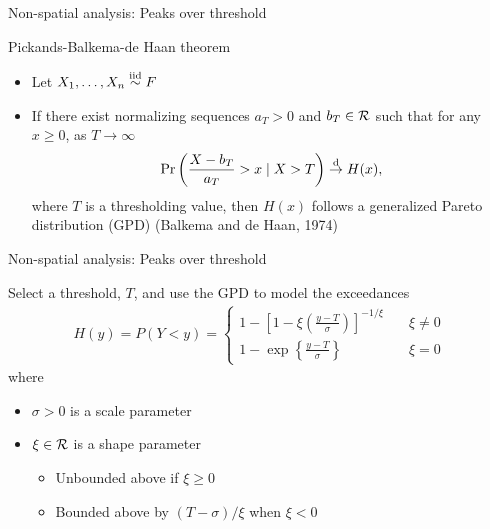 \documentclass{beamer}
\begin{document}
 \begin{frame}{Non-spatial analysis: Peaks over threshold}
 \begin{adjustwidth}{1em}{0em}
   Pickands-Balkema-de Haan theorem \vspace{1em}
   \begin{itemize} \setlength{\itemsep}{1em}
     \item Let $X_1, \ldots, X_n \stackrel{\mathrm{iid}}{\sim} F$
     \item If there exist normalizing sequences $a_T > 0$ and $b_T \in {\cal R}$ such that for any $x \ge 0$, as $T \rightarrow \infty$
     \begin{align*}
       \Pr\left(\frac{X - b_T}{a_T} > x \mid X > T\right) \stackrel{\mathrm{d}}{\rightarrow} H(x),
     \end{align*}
     where $T$ is a thresholding value, then $H(x)$ follows a generalized Pareto distribution (GPD) (Balkema and de Haan, 1974)
   \end{itemize}
 \end{adjustwidth}
 \end{frame}

 \begin{frame}{Non-spatial analysis: Peaks over threshold}
 \begin{adjustwidth}{1em}{0em}
   Select a threshold, $T$, and use the GPD to model the exceedances
   \begin{align*}
     H(y) = P(Y < y) = \left\{ \begin{array}{ll}
       1 - \left[1 - \xi \left( \frac{ y - T }{ \sigma } \right) \right]^{-1 / \xi} & \quad \xi \neq 0 \\[0.5em]
       1 - \exp \left\{ \frac{ y - T }{ \sigma} \right\} & \quad \xi = 0
     \end{array}\right.
   \end{align*}
   where
   \begin{itemize} \setlength{\itemsep}{0.25em}
     \item $\sigma > 0$ is a scale parameter
     \item $\xi \in {\cal R}$ is a shape parameter
     \begin{itemize}
       \item Unbounded above if $\xi \ge 0$
       \item Bounded above by $(T - \sigma) / \xi$ when $\xi < 0$
     \end{itemize}
   \end{itemize}
 \end{adjustwidth}
 \end{frame}
\end{document}
